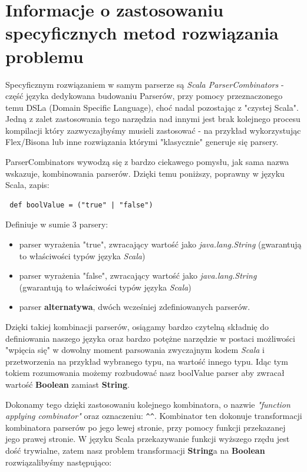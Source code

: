 \documentclass[a4paper]{article}
\begin{document}
\newpage
\section{Informacje o zastosowaniu specyficznych metod rozwiązania problemu}
Specyficznym rozwiązaniem w samym parserze są \textit{Scala ParserCombinators} - część języka dedykowana budowaniu Parserów, przy pomocy przeznaczonego
temu DSLa (Domain Specific Language), choć nadal pozostając z "czystej Scala". Jedną z zalet zastosowania tego narzędzia nad innymi jest 
brak kolejnego procesu kompilacji który zazwyczajbyśmy musieli zastosować - na przykład wykorzystując Flex/Bisona lub inne rozwiązania którymi
"klasycznie" generuje się parsery. 

ParserCombinators wywodzą się z bardzo ciekawego pomysłu, jak sama nazwa wskazuje, kombinowania parserów. Dzięki temu poniższy, poprawny w języku Scala,
zapis: 

\begin{verbatim}
 def boolValue = ("true" | "false")
\end{verbatim}

Definiuje w sumie 3 parsery:
\begin{itemize}
 \item parser wyrażenia "true", zwracający wartość jako \textit{java.lang.String} (gwarantują to właściwości typów języka \textit{Scala})
 \item parser wyrażenia "false", zwracający wartość jako \textit{java.lang.String} (gwarantują to właściwości typów języka \textit{Scala})
 \item parser \textbf{alternatywa}, dwóch wcześniej zdefiniowanych parserów. 
\end{itemize}
Dzięki takiej kombinacji parserów, osiągamy bardzo czytelną składnię do definiowania naszego języka oraz bardzo potężne narzędzie w postaci 
możliwości "wpięcia się" w dowolny moment parsowania zwyczajnym kodem \textit{Scala} i przetworzenia na przykład wybranego typu, na wartość
innego typu. Idąc tym tokiem rozumowania możemy rozbudować nasz boolValue parser aby zwracał wartość \textbf{Boolean} zamiast \textbf{String}.

Dokonamy tego dzięki zastosowaniu kolejnego kombinatora, o nazwie \textit{"function applying combinator"} oraz oznaczeniu: \verb|^^|.
Kombinator ten dokonuje transformacji kombinatora parserów po jego lewej stronie, przy pomocy funkcji przekazanej jego prawej stronie.
W języku Scala przekazywanie funkcji wyższego rzędu jest dość trywialne, zatem nasz problem transformacji \textbf{String}a na \textbf{Boolean} 
rozwiązalibyśmy następująco:
\end{document}
